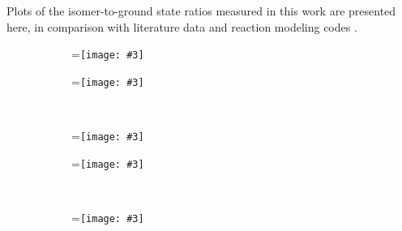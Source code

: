 \documentclass[3p]{elsarticle}
\newcommand{\subfigimg}[4][,]{%
  \setbox1=\hbox{\texttt{[image: \#3]}}%
  \leavevmode\rlap{\usebox1}%
  \rlap{\hspace*{#4pt}\raisebox{\dimexpr\ht1-2\baselineskip}{#2}}%
  \phantom{\usebox1}%
}
\begin{document}
Plots of the isomer-to-ground state ratios measured in this work are presented here, in comparison with literature data and reaction modeling codes \cite{MICHEL1997153,Ditroi2008,Titarenko2011,Graves2016}.





\begin{figure}
    \centering
    \begin{subfigure}[t]{0.495\textwidth}
        \centering
        \subfigimg[width=\linewidth]{}{./figures/52Mn_IBR.pdf}{50}
         \label{fig:52Mn_IBR}
    \end{subfigure}%
     \begin{subfigure}[t]{0.495\textwidth}
        \centering
        \subfigimg[width=\linewidth]{}{./figures/58Co_IBR.pdf}{50}
         \label{fig:58Co_IBR}
    \end{subfigure}%
    \\
    \begin{subfigure}[t]{0.495\textwidth}
        \centering
        \subfigimg[width=\linewidth]{}{./figures/85Y_IBR.pdf}{50}
                 \label{fig:85Y_IBR}
    \end{subfigure}
     \begin{subfigure}[t]{0.495\textwidth}
        \centering
        \subfigimg[width=\linewidth]{}{./figures/87Y_IBR.pdf}{50}
         \label{fig:87Y_IBR}
    \end{subfigure}%
    \\
    \begin{subfigure}[t]{0.495\textwidth}
        \centering
        \subfigimg[width=\linewidth]{}{./figures/89Nb_IBR.pdf}{50}
                 \label{fig:89Nb_IBR}
    \end{subfigure}
     \label{fig:ibr_curves}
\end{figure}
\end{document}
